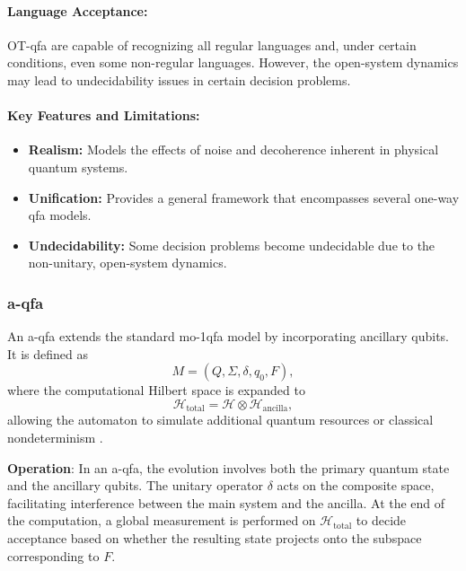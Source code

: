 \paragraph{Language Acceptance:}  
OT-qfa are capable of recognizing all regular languages and, under certain conditions, even some non-regular languages. However, the open-system dynamics may lead to undecidability issues in certain decision problems.

\paragraph{Key Features and Limitations:}
\begin{itemize}
    \item \textbf{Realism:} Models the effects of noise and decoherence inherent in physical quantum systems.
    \item \textbf{Unification:} Provides a general framework that encompasses several one-way qfa models.
    \item \textbf{Undecidability:} Some decision problems become undecidable due to the non-unitary, open-system dynamics.
\end{itemize}

\subsubsection{\acrfull{a-qfa}}
\label{sssec:a-qfa}
\begin{definition}
An \gls{a-qfa} extends the standard mo-1qfa model by incorporating ancillary qubits. It is defined as 
\[
M = (Q, \Sigma, \delta, q_0, F),
\]
where the computational Hilbert space is expanded to 
\[
\mathcal{H}_{\text{total}} = \mathcal{H} \otimes \mathcal{H}_{\text{ancilla}},
\]
allowing the automaton to simulate additional quantum resources or classical nondeterminism \cite{paschen2000quantum}.
\end{definition}

\textbf{Operation}:  
In an \gls{a-qfa}, the evolution involves both the primary quantum state and the ancillary qubits. The unitary operator \(\delta\) acts on the composite space, facilitating interference between the main system and the ancilla. At the end of the computation, a global measurement is performed on \(\mathcal{H}_{\text{total}}\) to decide acceptance based on whether the resulting state projects onto the subspace corresponding to \( F \).

